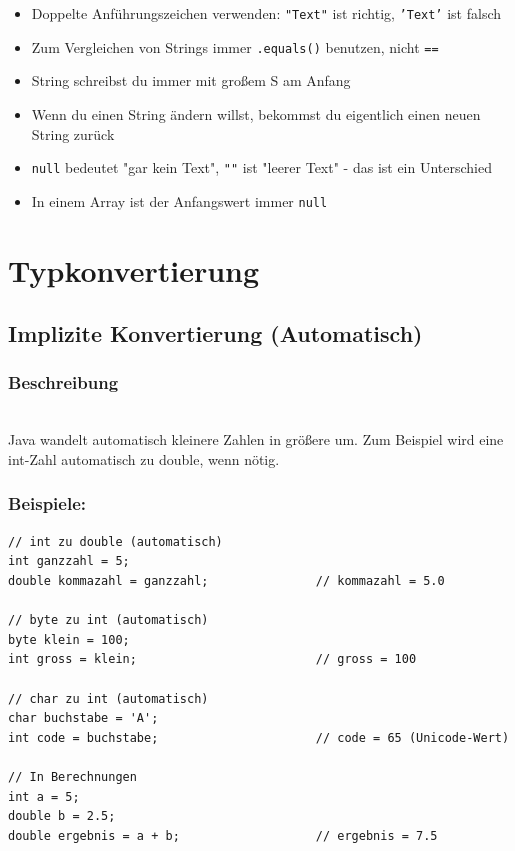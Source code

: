 \begin{achtung}
	\begin{itemize}
		\item Doppelte Anführungszeichen verwenden: \texttt{"Text"} ist richtig, \texttt{'Text'} ist falsch
		\item Zum Vergleichen von Strings immer \texttt{.equals()} benutzen, nicht \texttt{==}
		\item String schreibst du immer mit großem S am Anfang
		\item Wenn du einen String ändern willst, bekommst du eigentlich einen neuen String zurück
		\item \texttt{null} bedeutet "gar kein Text", \texttt{""} ist "leerer Text" - das ist ein Unterschied
		\item In einem Array ist der Anfangswert immer \texttt{null}
	\end{itemize}
\end{achtung}

\newpage


\section*{Typkonvertierung}

\subsection*{Implizite Konvertierung (Automatisch)}

\subsubsection*{Beschreibung}\\
Java wandelt automatisch kleinere Zahlen in größere um. Zum Beispiel wird eine int-Zahl automatisch zu double, wenn nötig.

\subsubsection*{Beispiele:}
\begin{lstlisting}
// int zu double (automatisch)
int ganzzahl = 5;
double kommazahl = ganzzahl;               // kommazahl = 5.0

// byte zu int (automatisch)
byte klein = 100;
int gross = klein;                         // gross = 100

// char zu int (automatisch)
char buchstabe = 'A';
int code = buchstabe;                      // code = 65 (Unicode-Wert)

// In Berechnungen
int a = 5;
double b = 2.5;
double ergebnis = a + b;                   // ergebnis = 7.5
\end{lstlisting}


